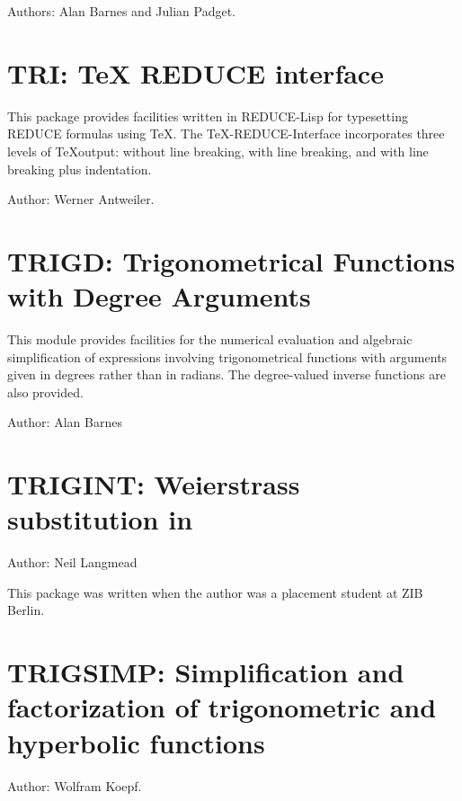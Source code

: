Authors:  Alan Barnes and Julian Padget.


\newpage

\section{TRI: TeX REDUCE interface} 

This package provides facilities written in REDUCE-Lisp for typesetting
REDUCE formulas using \TeX.  The \TeX-REDUCE-Interface incorporates three
levels of \TeX output: without line breaking, with line breaking, and
with line breaking plus indentation.

Author: Werner Antweiler.

\newpage

\section{TRIGD: Trigonometrical Functions \protect\\ with Degree Arguments}

This module provides facilities for the numerical evaluation and
algebraic simplification of expressions involving trigonometrical
functions with arguments given in degrees rather than in radians. The
degree-valued inverse functions are also provided.

Author: Alan Barnes


\newpage

\section{TRIGINT: Weierstrass substitution in \REDUCE}

Author: Neil Langmead

This package was written when the author was a placement student at ZIB Berlin.



\section{TRIGSIMP: Simplification and factorization of trigonometric
and hyperbolic functions} 

\label{TRIGSIMP}

\iffalse
TRIGSIMP is a useful tool for all kinds of trigonometric and hyperbolic
simplification and factorization.  There are three procedures included in
TRIGSIMP: trigsimp, trigfactorize and triggcd.  The first is for finding
simplifications of trigonometric or hyperbolic expressions with many
options, the second for factorizing them and the third for finding the
greatest common divisor of two trigonometric or hyperbolic polynomials.
\fi
Author: Wolfram Koepf.

